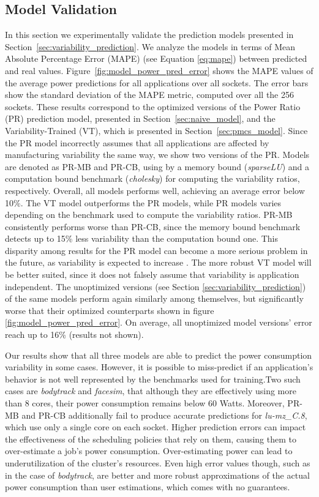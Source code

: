 \subsection{Model Validation}
\label{sec:model_validation}

In this section we experimentally validate the prediction models presented in
Section~\ref{sec:variability_prediction}.  We analyze the models in terms of Mean Absolute
Percentage Error (MAPE) (see Equation \ref{eq:mape})  between predicted and real values.
Figure~\ref{fig:model_power_pred_error} shows the MAPE values of the average power
predictions for all applications over all sockets.  The error bars show the standard
deviation of the MAPE metric, computed over all the 256 sockets.  These results correspond
to the optimized versions of the Power Ratio (PR) prediction model, presented in
Section~\ref{sec:naive_model}, and the Variability-Trained (VT), which is presented in
Section~\ref{sec:pmcs_model}.  Since the PR model incorrectly assumes that all
applications are affected by manufacturing variability the same way, we show two versions
of the PR. Models are denoted as PR-MB and PR-CB, using by a memory bound
(\textit{sparseLU}) and a computation bound benchmark (\textit{cholesky}) for computing
the variability ratios, respectively.  Overall, all models performs well, achieving an
average error below 10\%.  The VT model outperforms the PR models, while PR models varies
depending on the benchmark used to compute the variability ratios.  PR-MB consistently
performs worse than PR-CB, since the memory bound benchmark detects up to 15\% less
variability than the computation bound one.  This disparity among results for the PR model
can become a more serious problem in the future, as variability is expected to increase
\cite{Marathe:2017:ESP:3149412.3149421}.  The more robust VT model will be better suited,
since it does not falsely assume that variability is application independent.  The
unoptimized versions (see Section \ref{sec:variability_prediction}) of the same models
perform again similarly among themselves, but significantly worse that their optimized
counterparts shown in figure \ref{fig:model_power_pred_error}.  On average, all
unoptimized model versions' error reach up to 16\% (results not shown).
\par
Our results show that all three models are able to predict the power consumption
variability in some cases.  However, it is possible to miss-predict if an application's
behavior is not well represented by the benchmarks used for training.Two such cases
are \textit{bodytrack} and \textit{facesim},  that although they are effectively using more
than 8 cores, their power consumption remains below 60 Watts.  Moreover, PR-MB and PR-CB
additionally fail to produce accurate predictions for \textit{lu-mz\_C.8}, which use only
a single core on each socket.  Higher prediction errors can impact the effectiveness of
the scheduling policies that rely on them, causing them to over-estimate a job's power
consumption.  Over-estimating power can lead to underutilization of the cluster's
resources.  Even high error values though, such as in the case of \textit{bodytrack}, are
better and more robust approximations of the actual power consumption than user
estimations, which comes with no guarantees. 

